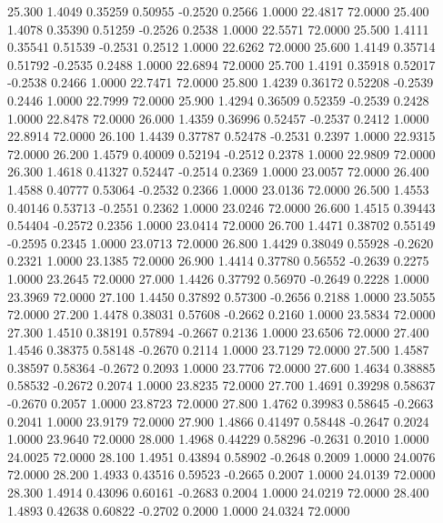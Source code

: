   25.300   1.4049   0.35259   0.50955  -0.2520   0.2566   1.0000  22.4817  72.0000
  25.400   1.4078   0.35390   0.51259  -0.2526   0.2538   1.0000  22.5571  72.0000
  25.500   1.4111   0.35541   0.51539  -0.2531   0.2512   1.0000  22.6262  72.0000
  25.600   1.4149   0.35714   0.51792  -0.2535   0.2488   1.0000  22.6894  72.0000
  25.700   1.4191   0.35918   0.52017  -0.2538   0.2466   1.0000  22.7471  72.0000
  25.800   1.4239   0.36172   0.52208  -0.2539   0.2446   1.0000  22.7999  72.0000
  25.900   1.4294   0.36509   0.52359  -0.2539   0.2428   1.0000  22.8478  72.0000
  26.000   1.4359   0.36996   0.52457  -0.2537   0.2412   1.0000  22.8914  72.0000
  26.100   1.4439   0.37787   0.52478  -0.2531   0.2397   1.0000  22.9315  72.0000
  26.200   1.4579   0.40009   0.52194  -0.2512   0.2378   1.0000  22.9809  72.0000
  26.300   1.4618   0.41327   0.52447  -0.2514   0.2369   1.0000  23.0057  72.0000
  26.400   1.4588   0.40777   0.53064  -0.2532   0.2366   1.0000  23.0136  72.0000
  26.500   1.4553   0.40146   0.53713  -0.2551   0.2362   1.0000  23.0246  72.0000
  26.600   1.4515   0.39443   0.54404  -0.2572   0.2356   1.0000  23.0414  72.0000
  26.700   1.4471   0.38702   0.55149  -0.2595   0.2345   1.0000  23.0713  72.0000
  26.800   1.4429   0.38049   0.55928  -0.2620   0.2321   1.0000  23.1385  72.0000
  26.900   1.4414   0.37780   0.56552  -0.2639   0.2275   1.0000  23.2645  72.0000
  27.000   1.4426   0.37792   0.56970  -0.2649   0.2228   1.0000  23.3969  72.0000
  27.100   1.4450   0.37892   0.57300  -0.2656   0.2188   1.0000  23.5055  72.0000
  27.200   1.4478   0.38031   0.57608  -0.2662   0.2160   1.0000  23.5834  72.0000
  27.300   1.4510   0.38191   0.57894  -0.2667   0.2136   1.0000  23.6506  72.0000
  27.400   1.4546   0.38375   0.58148  -0.2670   0.2114   1.0000  23.7129  72.0000
  27.500   1.4587   0.38597   0.58364  -0.2672   0.2093   1.0000  23.7706  72.0000
  27.600   1.4634   0.38885   0.58532  -0.2672   0.2074   1.0000  23.8235  72.0000
  27.700   1.4691   0.39298   0.58637  -0.2670   0.2057   1.0000  23.8723  72.0000
  27.800   1.4762   0.39983   0.58645  -0.2663   0.2041   1.0000  23.9179  72.0000
  27.900   1.4866   0.41497   0.58448  -0.2647   0.2024   1.0000  23.9640  72.0000
  28.000   1.4968   0.44229   0.58296  -0.2631   0.2010   1.0000  24.0025  72.0000
  28.100   1.4951   0.43894   0.58902  -0.2648   0.2009   1.0000  24.0076  72.0000
  28.200   1.4933   0.43516   0.59523  -0.2665   0.2007   1.0000  24.0139  72.0000
  28.300   1.4914   0.43096   0.60161  -0.2683   0.2004   1.0000  24.0219  72.0000
  28.400   1.4893   0.42638   0.60822  -0.2702   0.2000   1.0000  24.0324  72.0000
